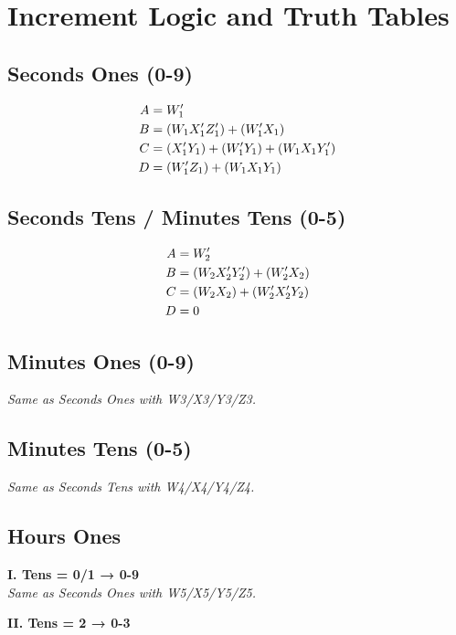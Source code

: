 \section{Increment Logic and Truth Tables}

\subsection{Seconds Ones (0-9)}


\begin{align}
A &= W_1' \notag\\
B &= (W_1 X_1' Z_1') + (W_1' X_1) \notag\\
C &= (X_1' Y_1) + (W_1' Y_1) + (W_1 X_1 Y_1') \notag\\
D &= (W_1' Z_1) + (W_1 X_1 Y_1) \notag
\end{align}

\subsection{Seconds Tens / Minutes Tens (0-5)}


\begin{align}
A &= W_2' \notag\\
B &= (W_2 X_2' Y_2') + (W_2' X_2) \notag\\
C &= (W_2 X_2) + (W_2' X_2' Y_2) \notag\\
D &= 0 \notag
\end{align}

\subsection{Minutes Ones (0-9)}
\textit{Same as Seconds Ones with W3/X3/Y3/Z3.}

\subsection{Minutes Tens (0-5)}
\textit{Same as Seconds Tens with W4/X4/Y4/Z4.}

\subsection{Hours Ones}
\textbf{I. Tens = 0/1 → 0-9 }\\
\textit{Same as Seconds Ones with W5/X5/Y5/Z5.}

\textbf{II. Tens = 2 → 0-3}


